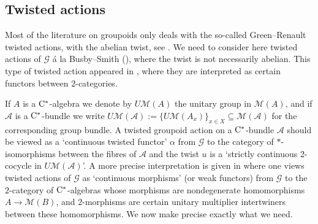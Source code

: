 \documentclass[11 pt, leqno]{amsart}
\numberwithin{equation}{section}
\theoremstyle{plain}
\theoremstyle{definition}
\newcommand*{\cstar}{\texorpdfstring{\(\Cst\)\nobreakdash-\hspace{0pt}}{*-}}
\newcommand*{\Cst}{\mathrm \cst}%
\newcommand{\M}{\mathcal M}
\newcommand{\G}{\mathcal G} %
\newcommand{\A}{\mathcal A}
\newcommand{\cst}{\ifmmode\mathrm{C}^*\else{$\mathrm{C}^*$}\fi}
\begin{document}
%
\subsection*{Twisted actions}

Most of the literature on groupoids only deals with the so-called Green--Renault twisted actions, with the abelian twist, see \cite{Renault,Renault2}. 
We need to consider here twisted actions of $\G$ \'a la Busby--Smith (\cite{BusbySmith}), where the twist is not necessarily abelian. 
This type of twisted action appeared in \cite{BussMeyerZhu}, where they are interpreted as certain functors between $2$-categories. 

If $A$ is a $\cst$-algebra we denote by $U\M(A)$ the unitary group in $\M(A)$, and if $\A$ is a $\cst$-bundle we write $U\M(\A):=\{U\M(A_{x})\}_{x\in X}\subseteq \M(\A)$ for the corresponding group bundle.
A twisted groupoid action on a $\cst$-bundle $\A$ should be viewed as a `continuous twisted functor' $\alpha$ from $\G$ to the category of $*$-isomorphisms between the fibres of $\A$ and the twist $u$ is a `strictly continuous 2-cocycle in  $U\M(\A)$'. 
A more precise interpretation is given in \cite{BussMeyerZhu} where one views twisted actions of $\G$ as `continuous morphisms' (or weak functors) from $\G$ to the $2$-category of \cstar{}algebras whose morphisms are nondegenerate homomorphisms $A\to \M(B)$, and $2$-morphisms are certain unitary multiplier intertwiners between these homomorphisms. 
We now make precise exactly what we need. 
\end{document}
